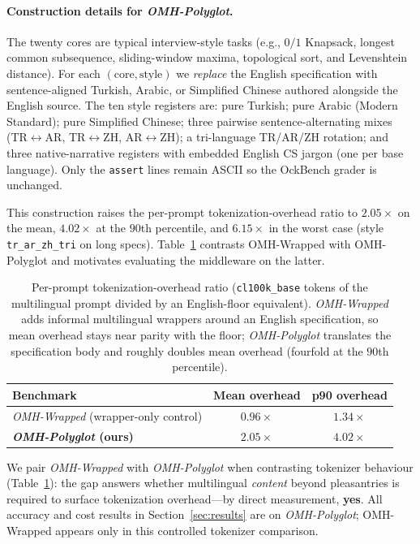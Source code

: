 \documentclass[11pt,a4paper,twocolumn]{article}
\begin{document}
\paragraph{Construction details for \textit{OMH-Polyglot}.}
The twenty cores are typical interview-style tasks (e.g., $0/1$ Knapsack, longest common subsequence, sliding-window maxima, topological sort, and Levenshtein distance). For each $(\text{core},\text{style})$ we \emph{replace} the English specification with sentence-aligned Turkish, Arabic, or Simplified Chinese authored alongside the English source. The ten style registers are: pure Turkish; pure Arabic (Modern Standard); pure Simplified Chinese; three pairwise sentence-alternating mixes (TR$\leftrightarrow$AR, TR$\leftrightarrow$ZH, AR$\leftrightarrow$ZH); a tri-language TR/AR/ZH rotation; and three native-narrative registers with embedded English CS jargon (one per base language). Only the \texttt{assert} lines remain ASCII so the OckBench grader is unchanged.

This construction raises the per-prompt tokenization-overhead ratio to $\mathbf{2.05\times}$ on the mean, $4.02\times$ at the $90$th percentile, and $6.15\times$ in the worst case (style \texttt{tr\_ar\_zh\_tri} on long specs). Table~\ref{tab:tokenization-overhead-bench} contrasts OMH-Wrapped with OMH-Polyglot and motivates evaluating the middleware on the latter.

\begin{table}[h]
\centering
\small
\begin{tabular}{lcc}
\toprule
\textbf{Benchmark} & \textbf{Mean overhead} & \textbf{p90 overhead} \\
\midrule
\textit{OMH-Wrapped} (wrapper-only control) & $0.96\times$ & $1.34\times$ \\
\textbf{\textit{OMH-Polyglot} (ours)}    & $\mathbf{2.05\times}$ & $\mathbf{4.02\times}$ \\
\bottomrule
\end{tabular}
\caption{Per-prompt tokenization-overhead ratio (\texttt{cl100k\_base} tokens of the multilingual prompt divided by an English-floor equivalent). \textit{OMH-Wrapped} adds informal multilingual wrappers around an English specification, so mean overhead stays near parity with the floor; \textit{OMH-Polyglot} translates the specification body and roughly doubles mean overhead (fourfold at the $90$th percentile).}
\label{tab:tokenization-overhead-bench}
\end{table}

We pair \textit{OMH-Wrapped} with \textit{OMH-Polyglot} when contrasting tokenizer behaviour (Table~\ref{tab:tokenization-overhead-bench}): the gap answers whether multilingual \emph{content} beyond pleasantries is required to surface tokenization overhead---by direct measurement, \textbf{yes}. All accuracy and cost results in Section~\ref{sec:results} are on \textit{OMH-Polyglot}; OMH-Wrapped appears only in this controlled tokenizer comparison.
\end{document}
